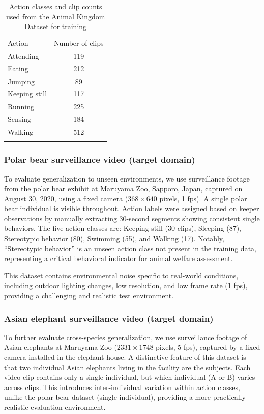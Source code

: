 \documentclass[twocolumn]{svjour3}
\begin{document}
\begin{table}[t]
  \caption{Action classes and clip counts used from the Animal Kingdom Dataset for training}
  \label{tab:ak_actions}
  \begin{tabular}{lc}
    \hline\noalign{\smallskip}
    Action & Number of clips \\
    \noalign{\smallskip}\hline\noalign{\smallskip}
    Attending & 119 \\
    Eating & 212 \\
    Jumping & 89 \\
    Keeping still & 117 \\
    Running & 225 \\
    Sensing & 184 \\
    Walking & 512 \\
    \noalign{\smallskip}\hline
  \end{tabular}
\end{table}

\subsubsection{Polar bear surveillance video (target domain)}

To evaluate generalization to unseen environments, we use surveillance footage from the polar bear exhibit at Maruyama Zoo, Sapporo, Japan, captured on August 30, 2020, using a fixed camera ($368 \times 640$ pixels, 1 fps).
A single polar bear individual is visible throughout.
Action labels were assigned based on keeper observations by manually extracting 30-second segments showing consistent single behaviors.
The five action classes are: Keeping still (30 clips), Sleeping (87), Stereotypic behavior (80), Swimming (55), and Walking (17).
Notably, ``Stereotypic behavior'' is an unseen action class not present in the training data, representing a critical behavioral indicator for animal welfare assessment.

This dataset contains environmental noise specific to real-world conditions, including outdoor lighting changes, low resolution, and low frame rate (1 fps), providing a challenging and realistic test environment.

\subsubsection{Asian elephant surveillance video (target domain)}

To further evaluate cross-species generalization, we use surveillance footage of Asian elephants at Maruyama Zoo ($2331 \times 1748$ pixels, 5 fps), captured by a fixed camera installed in the elephant house.
A distinctive feature of this dataset is that two individual Asian elephants living in the facility are the subjects.
Each video clip contains only a single individual, but which individual (A or B) varies across clips.
This introduces inter-individual variation within action classes, unlike the polar bear dataset (single individual), providing a more practically realistic evaluation environment.
\end{document}

